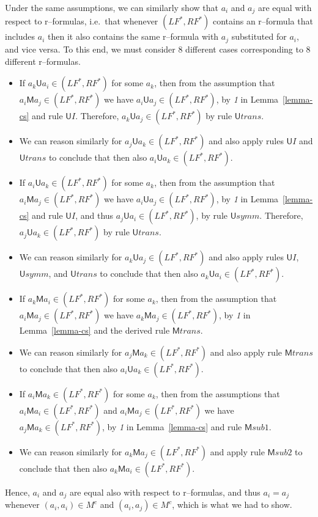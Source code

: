 \documentclass[times, 10pt]{article}
\newcommand{\Un}{\textsf{U}}
\newcommand{\Me}{\textsf{M}}
\newcommand{\Uns}{\Un \mathit{symm}}
\newcommand{\Unt}{\Un \mathit{trans}}
\renewcommand{\Un}{\mathsf{U}}
\renewcommand{\Me}{\mathsf{M}}
\newcommand{\Metrans}{\Me\mathit{trans}}
\newcommand{\Mesubone}{\Me\mathit{sub1}}
\newcommand{\Mesubtwo}{\Me\mathit{sub2}}
\newcommand{\LF}{\mathit{LF}}
\newcommand{\RF}{\mathit{RF}}
\begin{document}
\begin{itemize}
Under the same assumptions, we can similarly show that $a_i$ and $a_j$ are equal with 
respect to r--formulas, i.e.~that whenever $(\LF^*,\RF^*)$ contains an r--formula that includes $
a_i$ then it also contains the same r--formula with $a_j$ substituted for $a_i$, and vice versa. 
To this end, we must consider 8 different cases corresponding to 8 different r--formulas. 
\begin{itemize}
\item If $a_k \Un a_i \in (\LF^*,\RF^*)$ for some $a_k$, then from the assumption that 
$a_i \Me a_j \in (\LF^*,\RF^*)$ we have $a_i \Un a_j \in (\LF^*,\RF^*)$, 
by \emph{1} in Lemma~\ref{lemma-cs} and rule $\Un I$. Therefore, 
$a_k \Un a_j \in (\LF^*,\RF^*)$ by rule $\Unt$.  
\item We can reason similarly for $a_j \Un a_k \in (\LF^*,\RF^*)$ and also apply rules $\Un I$ 
and $\Unt$ to conclude that then also $a_i \Un a_k \in (\LF^*,\RF^*)$. 
\item If $a_i \Un a_k \in (\LF^*,\RF^*)$ for some $a_k$, then from the assumption that 
$a_i \Me a_j \in (\LF^*,\RF^*)$ we have $a_i \Un a_j \in (\LF^*,\RF^*)$, 
by \emph{1} in Lemma~\ref{lemma-cs} and rule $\Un I$, and thus 
$a_j \Un a_i \in (\LF^*,\RF^*)$, by rule $\Uns$. Therefore, 
$a_j \Un a_k \in (\LF^*,\RF^*)$ by rule $\Unt$.  
\item We can reason similarly for $a_k \Un a_j \in (\LF^*,\RF^*)$ and also apply rules $\Un I$,
$\Uns$, and $\Unt$ to conclude that then also $a_k \Un a_i \in (\LF^*,\RF^*)$. 
\item If $a_k \Me a_i \in (\LF^*,\RF^*)$ for some $a_k$, then from the assumption that 
$a_i \Me a_j \in (\LF^*,\RF^*)$ we have $a_k \Me a_j \in (\LF^*,\RF^*)$,
by \emph{1} in Lemma~\ref{lemma-cs} and the derived rule $\Metrans$.
\item We can reason similarly for $a_j \Me a_k \in (\LF^*,\RF^*)$ and also apply rule $\Metrans$
to conclude that then also $a_i \Un a_k \in (\LF^*,\RF^*)$. 
\item If $a_i \Me a_k \in (\LF^*,\RF^*)$ for some $a_k$, then from the assumptions that 
$a_i \Me a_i \in (\LF^*,\RF^*)$ and $a_i \Me a_j \in (\LF^*,\RF^*)$ we have 
$a_j \Me a_k \in (\LF^*,\RF^*)$, by \emph{1} in Lemma~\ref{lemma-cs} and rule $\Mesubone$.  
\item We can reason similarly for $a_k \Me a_j \in (\LF^*,\RF^*)$ and apply rule $\Mesubtwo$
to conclude that then also $a_k \Me a_i \in (\LF^*,\RF^*)$. 
\end{itemize}
Hence, $a_i$ and $a_j$ are equal also with respect to r--formulas, and thus
$a_i = a_j$ whenever $(a_i,a_i) \in M^c$ and $(a_i,a_j) \in M^c$, which is what we had to show.
\end{itemize}
\end{document}
